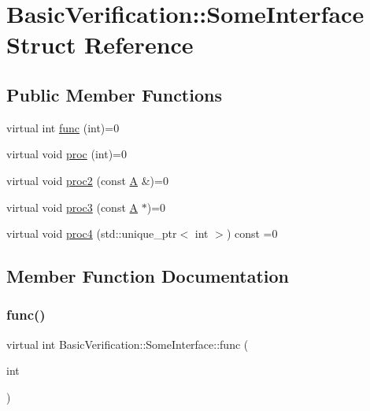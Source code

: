 \hypertarget{structBasicVerification_1_1SomeInterface}{}\section{Basic\+Verification\+::Some\+Interface Struct Reference}
\label{structBasicVerification_1_1SomeInterface}
\subsection*{Public Member Functions}
\begin{DoxyCompactItemize}
\item 
virtual int \mbox{\hyperlink{structBasicVerification_1_1SomeInterface_a2d736881f4c66483b4c9bc4fbae0a3e4}{func}} (int)=0
\item 
virtual void \mbox{\hyperlink{structBasicVerification_1_1SomeInterface_a13fea20c0c3946276d57ea6e315026bc}{proc}} (int)=0
\item 
virtual void \mbox{\hyperlink{structBasicVerification_1_1SomeInterface_a90c64f438ee03c198b7d51267d2eaba7}{proc2}} (const \mbox{\hyperlink{structA}{A}} \&)=0
\item 
virtual void \mbox{\hyperlink{structBasicVerification_1_1SomeInterface_a17ed0dc841d140da7b205e0ed746dd3c}{proc3}} (const \mbox{\hyperlink{structA}{A}} $\ast$)=0
\item 
virtual void \mbox{\hyperlink{structBasicVerification_1_1SomeInterface_a64b6c8a98b24ea075e4198eec8f4e393}{proc4}} (std\+::unique\+\_\+ptr$<$ int $>$) const =0
\end{DoxyCompactItemize}


\subsection{Member Function Documentation}
\mbox{\label{structBasicVerification_1_1SomeInterface_a2d736881f4c66483b4c9bc4fbae0a3e4}} 
\subsubsection{\texorpdfstring{func()}{func()}}
{\footnotesize\ttfamily virtual int Basic\+Verification\+::\+Some\+Interface\+::func (\begin{DoxyParamCaption}\item[{int}]{ }\end{DoxyParamCaption})\hspace{0.3cm}{\ttfamily [pure virtual]}}

